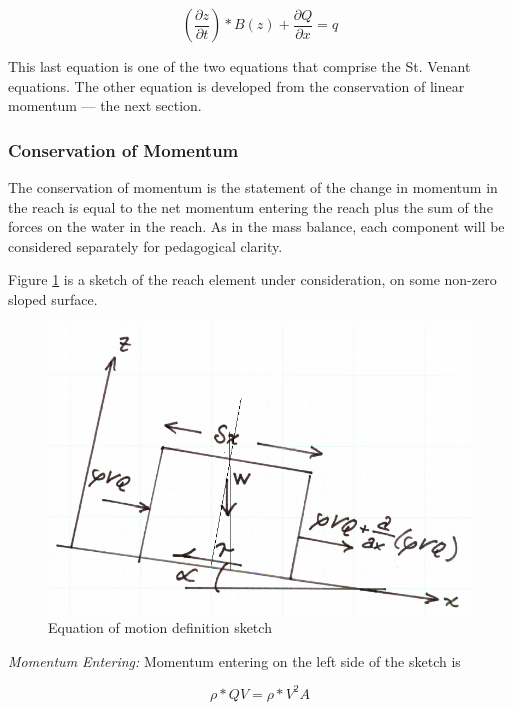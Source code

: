 \begin{equation}
( \frac{\partial z}{\partial t}) *B(z) + \frac{\partial Q}{\partial x} = q
\label{eqn:continunity}
\end{equation}

This last equation is one of the two equations that comprise the St. Venant equations.  The other equation is developed from the conservation of linear momentum --- the next section.

\subsubsection{Conservation of Momentum}
The conservation of momentum is the statement of the change in momentum in the reach is equal to the net momentum entering the reach plus the sum of the forces on the water in the reach.  As in the mass balance, each component will be considered separately for pedagogical clarity.

Figure \ref{fig:motion_sketch} is a sketch of the reach element under consideration, on some non-zero sloped surface.  
\begin{figure}[h!] %
   \centering
   \includegraphics[width=5in]{./12-OpenChannelFlow/motion_sketch1.jpg} 
   \caption{Equation of motion definition sketch}
   \label{fig:motion_sketch}
\end{figure}

\textsl{Momentum Entering:} 
Momentum entering on the left side of the sketch is 

\begin{equation}
\rho*QV = \rho*V^2A
\end{equation}


